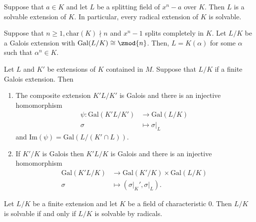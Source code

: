 \documentclass[12pt, a4paper]{article}
\newcommand{\gal}{\text{Gal}}
\begin{document}
\begin{mdprop}
    Suppose that \(a\in K\) and let \(L\) be a splitting field of \(x^n-a\) over \(K\). Then \(L\) is a solvable extension of \(K\). In particular, every radical extension of \(K\) is solvable.
\end{mdprop}

\begin{mdthm}
    Suppose that \(n\geq 1, \text{char}(K) \nmid n\) and \(x^n-1\) splits completely in \(K\). Let \(L/K\) be a Galois extension with \(\gal(L/K) \cong \zmod{n}\). Then, \(L=K(\alpha)\) for some \(\alpha\) such that \(\alpha^n \in K\).
\end{mdthm}

\begin{mdprop}
    Let \(L\) and \(K'\) be extensions of \(K\) contained in \(M\). Suppose that \(L/K\) if a finite Galois extension. Then 
    \begin{enumerate}
        \item The composite extension \(K'L/K'\) is Galois and there is an injective homomorphism
        \[\begin{aligned}
            \psi: \gal(K'L/K') &\to \gal(L/K) \\
            \sigma &\mapsto \sigma\vert_L
        \end{aligned}\]
        and \(\text{Im}(\psi) = \gal(L/(K'\cap L))\).
        \item If \(K'/K\) is Galois then \(K'L/K\) is Galois and there is an injective homomorphism
        \[\begin{aligned}
            \gal(K'L/K) &\to \gal(K'/K) \times \gal(L/K) \\
            \sigma &\mapsto (\sigma\vert_K',\sigma\vert_L).
        \end{aligned}\]
    \end{enumerate}
\end{mdprop}

\begin{mdthm}
    Let \(L/K\) be a finite extension and let \(K\) be a field of characteristic \(0\). Then \(L/K\) is solvable if and only if \(L/K\) is solvable by radicals.
\end{mdthm}
\end{document}
